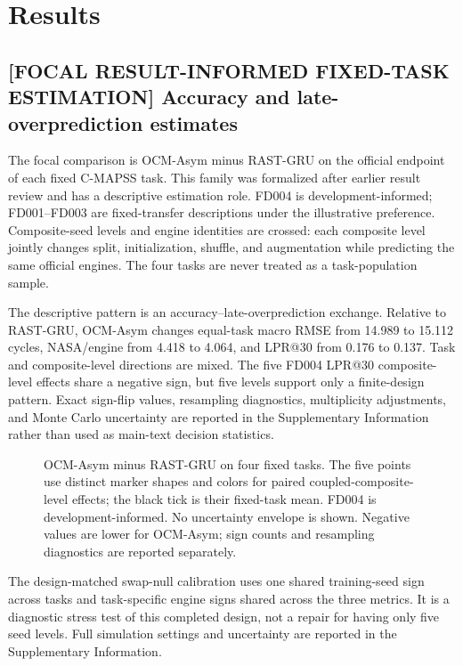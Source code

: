 
\FloatBarrier
\section{Results}

\subsection{[FOCAL RESULT-INFORMED FIXED-TASK ESTIMATION] Accuracy and late-overprediction estimates}

The focal comparison is OCM-Asym minus RAST-GRU on the official endpoint of each fixed C-MAPSS task. This family was formalized after earlier result review and has a descriptive estimation role. FD004 is development-informed; FD001--FD003 are fixed-transfer descriptions under the illustrative preference. Composite-seed levels and engine identities are crossed: each composite level jointly changes split, initialization, shuffle, and augmentation while predicting the same official engines. The four tasks are never treated as a task-population sample.

The descriptive pattern is an accuracy--late-overprediction exchange. Relative to RAST-GRU, OCM-Asym changes equal-task macro RMSE from 14.989 to 15.112 cycles, NASA/engine from 4.418 to 4.064, and LPR@30 from 0.176 to 0.137. Task and composite-level directions are mixed. The five FD004 LPR@30 composite-level effects share a negative sign, but five levels support only a finite-design pattern. Exact sign-flip values, resampling diagnostics, multiplicity adjustments, and Monte Carlo uncertainty are reported in the Supplementary Information rather than used as main-text decision statistics.

\begin{figure}[!t]
\centering
{}
\caption{OCM-Asym minus RAST-GRU on four fixed tasks. The five points use distinct marker shapes and colors for paired coupled-composite-level effects; the black tick is their fixed-task mean. FD004 is development-informed. No uncertainty envelope is shown. Negative values are lower for OCM-Asym; sign counts and resampling diagnostics are reported separately.}
\label{fig:primary-fixed-diagnostic}
\end{figure}

The design-matched swap-null calibration uses one shared training-seed sign across tasks and task-specific engine signs shared across the three metrics. It is a diagnostic stress test of this completed design, not a repair for having only five seed levels. Full simulation settings and uncertainty are reported in the Supplementary Information.
\FloatBarrier

